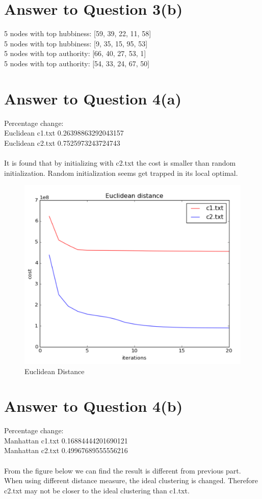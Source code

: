 \documentclass[11pt]{article}
\begin{document}
\pagebreak[4]
\section*{Answer to Question 3(b)}
5 nodes with top hubbiness: [59, 39, 22, 11, 58]\\
5 nodes with top hubbiness: [9, 35, 15, 95, 53]\\
5 nodes with top authority: [66, 40, 27, 53, 1]\\
5 nodes with top authority: [54, 33, 24, 67, 50]

\pagebreak[4]
\section*{Answer to Question 4(a)}
Percentage change:\\
Euclidean c1.txt 0.26398863292043157\\
Euclidean c2.txt 0.7525973243724743\\
\\
It is found that by initializing with c2.txt the cost is smaller than random initialization.
Random initialization seems get trapped in its local optimal.

\begin{figure}[h]
\center
\includegraphics[scale=0.7]{Euclidean.png}
\caption{Euclidean Distance}
\end{figure}


\pagebreak[4]
\section*{Answer to Question 4(b)}
Percentage change:\\
Manhattan c1.txt 0.16884444201690121\\
Manhattan c2.txt 0.49967689555556216\\
\\
From the figure below we can find the result is different from previous part. 
When using different distance measure, the ideal clustering is changed. Therefore c2.txt may not be closer to the ideal clustering than c1.txt.
\end{document}
